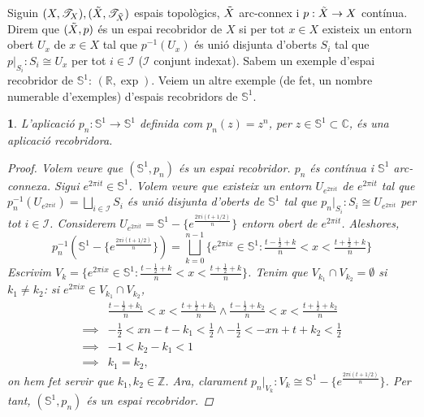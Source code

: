 \documentclass[compress,10pt]{article}
\newtheorem{enunciat}{}
\theoremstyle{definition}
\begin{document}
\pagestyle{fancy}
Siguin $(X,\mathscr{T}_{X}),(\Tilde{X},\mathscr{T}_{\Tilde{X}})$ espais topològics, $\Tilde{X}$ arc-connex i $p:\Tilde{X}\rightarrow X$ contínua. Direm que $(\Tilde{X},p)$ és un espai recobridor de $X$ si per tot $x\in X$ existeix un entorn obert $U_{x}$ de $x\in X$ tal que $p^{-1}(U_{x})$ és unió disjunta d'oberts $S_{i}$ tal que $p|_{S_{i}}:S_{i}\cong U_{x}$ per tot $i\in\mathscr{I}$ ($\mathscr{I}$ conjunt indexat).\newline
Sabem un exemple d'espai recobridor de $\mathbb{S}^{1}$: $(\mathbb{R},\exp)$. Veiem un altre exemple (de fet, un nombre numerable d'exemples) d'espais recobridors de $\mathbb{S}^{1}$.
\begin{enunciat}
    L'aplicació $p_{n}:\mathbb{S}^{1}\rightarrow\mathbb{S}^{1}$ definida com $p_{n}(z)=z^{n}$, per $z\in\mathbb{S}^{1}\subset\mathbb{C}$, és una aplicació recobridora.
    \begin{proof}
        Volem veure que $(\mathbb{S}^{1},p_{n})$ és un espai recobridor. $p_{n}$ és contínua i $\mathbb{S}^{1}$ arc-connexa. Sigui $e^{2\pi it}\in\mathbb{S}^{1}$. Volem veure que existeix un entorn $U_{e^{2\pi it}}$ de $e^{2\pi it}$ tal que $p_{n}^{-1}(U_{e^{2\pi it}})=\bigsqcup_{i\in\mathscr{I}}S_{i}$ és unió disjunta d'oberts de $\mathbb{S}^{1}$ tal que $p_{n}|_{S_{i}}:S_{i}\cong U_{e^{2\pi it}}$ per tot $i\in\mathscr{I}$. Considerem $U_{e^{2\pi it}}=\mathbb{S}^{1}-\{e^{\frac{2\pi i(t+1/2)}{n}}\}$ entorn obert de $e^{2\pi it}$. Aleshores,
        \begin{equation}
            p_{n}^{-1}(\mathbb{S}^{1}-\{e^{\frac{2\pi i(t+1/2)}{n}}\})
            =\bigsqcup_{k=0}^{n-1}\{e^{2\pi ix}\in\mathbb{S}^{1}:\tfrac{t-\frac{1}{2}+k}{n}<x<\tfrac{t+\frac{1}{2}+k}{n}\}
        \end{equation}
        Escrivim $V_{k}=\{e^{2\pi ix}\in\mathbb{S}^{1}:\tfrac{t-\frac{1}{2}+k}{n}<x<\tfrac{t+\frac{1}{2}+k}{n}\}$. Tenim que $V_{k_{1}}\cap V_{k_{2}}=\emptyset$ si $k_{1}\neq k_{2}$: si $e^{2\pi ix}\in V_{k_{1}}\cap V_{k_{2}}$,
        \begin{align*}
            &\tfrac{t-\frac{1}{2}+k_{1}}{n}<x<\tfrac{t+\frac{1}{2}+k_{1}}{n}
            \land\tfrac{t-\frac{1}{2}+k_{2}}{n}<x<\tfrac{t+\frac{1}{2}+k_{2}}{n}\\
            \implies
            &-\tfrac{1}{2}<xn-t-k_{1}<\tfrac{1}{2}
            \land-\tfrac{1}{2}<-xn+t+k_{2}<\tfrac{1}{2}\\
            \implies&-1<k_{2}-k_{1}<1\\
            \implies&k_{1}=k_{2},
        \end{align*}
        on hem fet servir que $k_{1},k_{2}\in\mathbb{Z}$. Ara, clarament $p_{n}|_{V_{k}}:V_{k}\cong\mathbb{S}^{1}-\{e^{\frac{2\pi i(t+1/2)}{n}}\}$. Per tant, $(\mathbb{S}^{1},p_{n})$ és un espai recobridor.
    \end{proof}
\end{enunciat}
\end{document}
